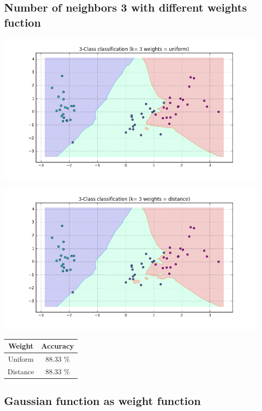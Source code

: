 \documentclass[11pt]{article}
\theoremstyle{plain}
\begin{document}
\subsection{Number of neighbors 3 with different weights fuction }

\begin{center}
\includegraphics[scale=0.3]{2}
\end{center}

\begin{center}
\includegraphics[scale=0.3]{3}
\end{center}

\begin{center}
 \begin{tabular}{||c c||} 
 \hline
 Weight &  Accuracy\\ [0.3ex] 
 \hline\hline
 Uniform &  88.33 \%  \\ 
 \hline
 Distance & 88.33 \%   \\
 \hline
\end{tabular}
\end{center}


\subsection{Gaussian function as weight function}
\end{document}
